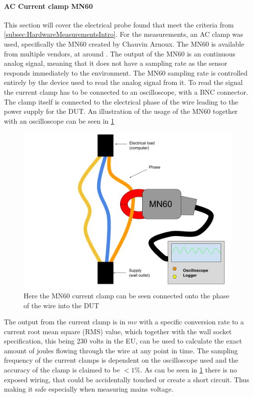 \paragraph*{AC Current clamp MN60}

This section will cover the electrical probe found that meet the criteria from \cref{subsec:HardwareMeasurementsIntro}. For the measurements, an AC clamp was used, specifically the MN60 created by Chauvin Arnoux\cite{ChauvinArnoux}. The MN60 is available from multiple vendors, at around . The output of the MN60 is an continuous analog signal, meaning that it does not have a sampling rate as the sensor responds immediately to the environment\cite{agarwal2005foundations}. The MN60 sampling rate is controlled entirely by the device used to read the analog signal from it\cite{agarwal2005foundations}. To read the signal the current clamp has to be connected to an oscilloscope, with a BNC connector\cite{ClampDoc}. The clamp itself is connected to the electrical phase of the wire leading to the power supply for the DUT. An illustration of the usage of the MN60 together with an oscilloscope can be seen in \cref{fig:clampSetup}

\begin{figure}[ht]
    \centering
    \includegraphics*[scale=0.25]{figures/CLAMP.png}
    \caption{Here the MN60 current clamp can be seen connected onto the phase of the wire into the DUT}
    \label{fig:clampSetup}
\end{figure}

The output from the current clamp is in $mv$ with a specific conversion rate to a current root mean square (RMS) value, which together with the wall socket specification, this being 230 volts in the EU\cite{sik}, can be used to calculate the exact amount of joules flowing through the wire at any point in time. The sampling frequency of the current clamps is dependent on the oscilloscope used and the accuracy of the clamp is claimed to be $<1\%$\cite{ClampDoc}. As can be seen in \ref{fig:clampSetup} there is no exposed wiring, that could be accidentally touched or create a short circuit. Thus making it safe especially when measuring mains voltage.


